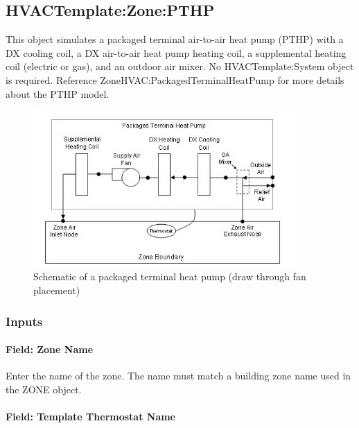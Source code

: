 \subsection{HVACTemplate:Zone:PTHP}\label{hvactemplatezonepthp}

This object simulates a packaged terminal air-to-air heat pump (PTHP) with a DX cooling coil, a DX air-to-air heat pump heating coil, a supplemental heating coil (electric or gas), and an outdoor air mixer. No HVACTemplate:System object is required. Reference ZoneHVAC:PackagedTerminalHeatPump for more details about the PTHP model.

\begin{figure}[hbtp] %
\centering
\includegraphics[width=0.9\textwidth, height=0.9\textheight, keepaspectratio=true]{media/image604.png}
\caption{Schematic of a packaged terminal heat pump (draw through fan placement) \protect \label{fig:schematic-of-a-packaged-terminal-heat-pump}}
\end{figure}

\subsubsection{Inputs}\label{inputs-5-014}

\paragraph{Field: Zone Name}\label{field-zone-name-4-001}

Enter the name of the zone. The name must match a building zone name used in the ZONE object.

\paragraph{Field: Template Thermostat Name}\label{field-template-thermostat-name-4}

